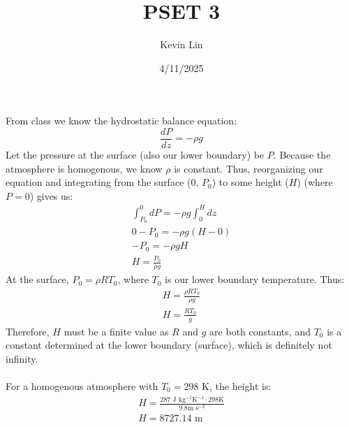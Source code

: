 \documentclass[11pt,a4paper,margin=1in]{article}
\title{PSET 3}
\author{Kevin Lin}
\date{4/11/2025}
\begin{document}
\maketitle
\section{}
From class we know the hydrostatic balance equation:
\[
    \frac{dP}{dz} = -\rho g
\]
Let the pressure at the surface (also our lower boundary) be $P$. Because the
atmosphere is homogenous, we know $\rho$ is constant. Thus, reorganizing our
equation and integrating from the surface (0, $P_0$) to some height ($H$) (where
$P = 0$) gives us:
\begin{gather*}
    \int_{P_0}^{0} dP = -\rho g \int_{0}^{H}  dz\\
    0 - P_0 = -\rho g (H - 0)\\
    -P_0 = -\rho g H\\
    H = \frac{P_0}{\rho g}
\end{gather*}
At the surface, $P_0 = \rho R T_0$, where $T_0$ is our lower boundary temperature.
Thus:
\begin{gather*}
    H = \frac{\rho R T_0}{\rho g}\\
    H = \frac{R T_0}{g}
\end{gather*}
Therefore, $H$ must be a finite value as $R$ and $g$ are both constants, and 
$T_0$ is a constant determined at the lower boundary (surface), which is 
definitely not infinity.
\\\\
For a homogenous atmosphere with $T_0 = 298 \text{ K}$, the height is:
\begin{gather*}
    H = \frac{287 \text{ J kg}^{-1} \text{K}^{-1} \cdot 298 \text{K}}
        {9.8 \text{m s}^{-2}}\\
    H = 8727.14 \text{ m}
\end{gather*}
\end{document}
